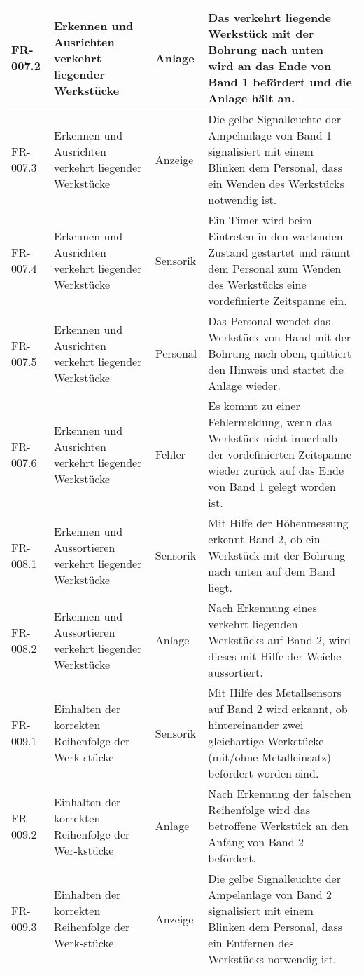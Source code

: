 \documentclass[oneside,a4paper,titlepage]{scrartcl} %
\begin{document}
\begin{small}
\begin{longtable}{|p{2cm}|p{4cm}|p{1.5cm}|p{5.5cm}|}
  \hline    
  FR-007.2 & Erkennen und Ausrichten verkehrt liegender Werkstücke & Anlage & Das verkehrt liegende Werkstück mit der Bohrung nach unten wird an das Ende von Band 1 befördert und die Anlage hält an.\\
  \hline
  FR-007.3 & Erkennen und Ausrichten verkehrt liegender Werkstücke & Anzeige & Die gelbe Signalleuchte der Ampelanlage von Band 1 signalisiert mit einem Blinken dem Personal, dass ein Wenden des Werkstücks notwendig ist.\\
  \hline    
  FR-007.4 & Erkennen und Ausrichten verkehrt liegender Werkstücke & Sensorik & Ein Timer wird beim Eintreten in den wartenden Zustand gestartet und räumt dem Personal zum Wenden des Werkstücks eine vordefinierte Zeitspanne ein.\\
  \hline    
  FR-007.5 & Erkennen und Ausrichten verkehrt liegender Werkstücke & Personal & Das Personal wendet das Werkstück von Hand mit der Bohrung nach oben, quittiert den Hinweis und startet die Anlage wieder.\\
  \hline    
  FR-007.6 & Erkennen und Ausrichten verkehrt liegender Werkstücke & Fehler & Es kommt zu einer Fehlermeldung, wenn das Werkstück nicht innerhalb der vordefinierten Zeitspanne wieder zurück auf das Ende von Band 1 gelegt worden ist.\\
  \hline
  \rowcolor{gray} FR-008.1 & Erkennen und Aussortieren verkehrt liegender Werkstücke & Sensorik & Mit Hilfe der Höhenmessung erkennt Band 2, ob ein Werkstück mit der Bohrung nach unten auf dem Band liegt.\\
  \hline    
  \rowcolor{gray} FR-008.2 & Erkennen und Aussortieren verkehrt liegender Werkstücke & Anlage & Nach Erkennung eines verkehrt liegenden Werkstücks auf Band 2, wird dieses mit Hilfe der Weiche aussortiert.\\
  \hline
  FR-009.1 & Einhalten der korrekten Reihenfolge der Werk-stücke & Sensorik & Mit Hilfe des Metallsensors auf Band 2 wird erkannt, ob hintereinander zwei gleichartige Werkstücke (mit/ohne Metalleinsatz) befördert worden sind.\\
  \hline    
  FR-009.2 & Einhalten der korrekten Reihenfolge der Wer-kstücke & Anlage & Nach Erkennung der falschen Reihenfolge wird das betroffene Werkstück an den Anfang von Band 2 befördert.\\
  \hline
  FR-009.3 & Einhalten der korrekten Reihenfolge der Werk-stücke & Anzeige & Die gelbe Signalleuchte der Ampelanlage von Band 2 signalisiert mit einem Blinken dem Personal, dass ein Entfernen des Werkstücks notwendig ist.\\

\end{longtable}
\end{small}
\end{document}
